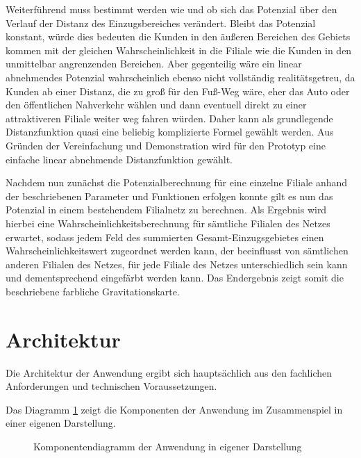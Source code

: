 Weiterführend muss bestimmt werden wie und ob sich das Potenzial über den Verlauf der Distanz des Einzugsbereiches verändert.
Bleibt das Potenzial konstant, würde dies bedeuten die Kunden in den äußeren Bereichen des Gebiets kommen mit der gleichen Wahrscheinlichkeit in die Filiale wie die Kunden in den unmittelbar angrenzenden Bereichen.
Aber gegenteilig wäre ein linear abnehmendes Potenzial wahrscheinlich ebenso nicht vollständig realitätsgetreu, da Kunden ab einer Distanz, die zu groß für den Fuß-Weg wäre, eher das Auto oder den öffentlichen Nahverkehr wählen und dann eventuell direkt zu einer attraktiveren Filiale weiter weg fahren würden. 
Daher kann als grundlegende Distanzfunktion quasi eine beliebig komplizierte Formel gewählt werden.
Aus Gründen der Vereinfachung und Demonstration wird für den Prototyp eine einfache linear abnehmende Distanzfunktion gewählt.

Nachdem nun zunächst die Potenzialberechnung für eine einzelne Filiale anhand der beschriebenen Parameter und Funktionen erfolgen konnte gilt es nun das Potenzial in einem bestehendem Filialnetz zu berechnen.
Als Ergebnis wird hierbei eine Wahrscheinlichkeitsberechnung für sämtliche Filialen des Netzes erwartet, sodass jedem Feld des summierten Gesamt-Einzugsgebietes einen Wahrscheinlichkeitswert zugeordnet werden kann, der beeinflusst von sämtlichen anderen Filialen des Netzes, für jede Filiale des Netzes unterschiedlich sein kann und dementsprechend eingefärbt werden kann.
Das Endergebnis zeigt somit die beschriebene farbliche Gravitationskarte.
\newpage

\section{Architektur}
Die Architektur der Anwendung ergibt sich hauptsächlich aus den fachlichen Anforderungen und technischen Voraussetzungen. 

Das Diagramm \ref{img:components_diagram} zeigt die Komponenten der Anwendung im Zusammenspiel in einer eigenen Darstellung.

\begin{figure}[H]
	\caption{Komponentendiagramm der Anwendung in eigener Darstellung}
	\label{img:components_diagram}
\end{figure}

